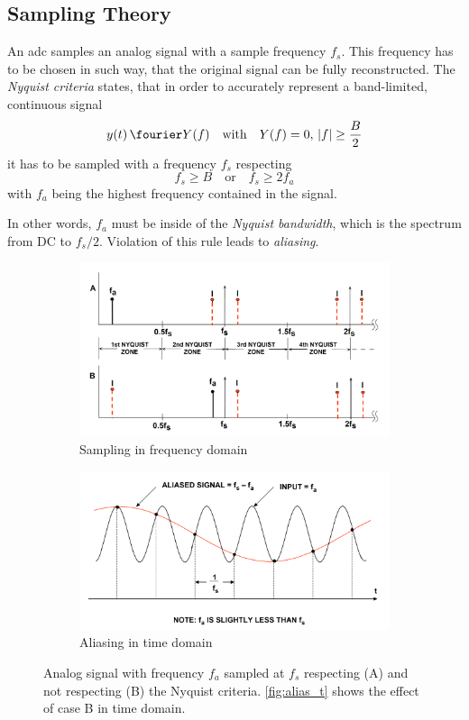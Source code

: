 \subsection{Sampling Theory}
An \gls{adc} samples an analog signal with a sample frequency $f_s$.
This frequency has to be chosen in such way, that the original signal can be fully reconstructed.
The \textit{Nyquist criteria} states, that in order to accurately represent a band-limited, continuous signal %
\begin{equation}
	y (t) \, \fourier  Y(f) \quad \text{with} \quad Y(f) = 0, \, |f| \geq \frac{B}{2}
\end{equation}
it has to be sampled with a frequency $f_s$ respecting
\begin{equation}
	f_s \geq B \quad \text{or} \quad f_s \geq 2 f_a
\end{equation}
with $f_a$ being the highest frequency contained in the signal. \cite{walt,puente2015}

In other words, $f_a$ must be inside of the \textit{Nyquist bandwidth}, which is the spectrum from DC to $f_s/2$. Violation of this rule leads to \textit{aliasing}.

\begin{figure}[tbh]
	\centering
	\begin{subfigure}{\textwidth}
		\centering
		\includegraphics[width=.6\linewidth]{chap/02-theory/img/alias_f}  
		\caption{Sampling in frequency domain}
		\label{fig:alias_f}
	\end{subfigure}
	\begin{subfigure}{\textwidth}
		\centering
		\includegraphics[width=.6\linewidth]{chap/02-theory/img/alias_t}  
		\caption{Aliasing in time domain}
		\label{fig:alias_t}
	\end{subfigure}
	\caption{Analog signal with frequency $f_a$ sampled at $f_s$ respecting (A) and not respecting (B) the Nyquist criteria. \autoref{fig:alias_t} shows the effect of case B in time domain. \cite{walt}}
\end{figure}

